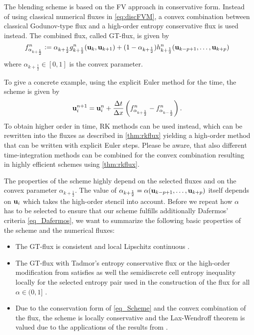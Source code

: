 \begin{definition}\label{def_Blending}
The blending scheme is based on the FV approach in conservative form. Instead of using classical numerical fluxes in 
\eqref{eq:discFVM}, a convex combination between classical Godunov-type flux  and  a high-order entropy conservative flux  is used instead. 
The combined flux, called GT-flux, is given by
	\begin{equation}\label{eq_GT_flux}
     f_{\alpha_{k+\frac 1 2}}^n := \alpha_{k + \frac 1 2} g^n_{k+\frac 1 2} ( {\mathbf{u}_k,\mathbf{u}_{k+1}}) + (1-\alpha_{k+\frac 1 2}) h^n_{k+\frac 1 2} (\mathbf{u}_{k-p+1}, \dots, \mathbf{u}_{k+p})
     	\end{equation}
	where $\alpha_{k+\frac 1 2} \in [0,1]$ is the convex parameter. 
\end{definition}
\begin{example}
To give a concrete example, using the explicit Euler method for the time,  the scheme is given by 
\begin{equation}\label{eq_Scheme}
\mathbf{u}^{n+1}_i =\mathbf{u}^{n}_i + \frac{\Delta t}{\Delta x} \left(  f_{\alpha_{k+\frac 1 2}}^n   - f_{\alpha_{k-\frac 1 2}}^n  \right).
\end{equation}
To obtain higher order in time, RK methods can be used instead, which can be rewritten into the fluxes as described in  \cref{thm:rkflux} yielding a high-order method that can be written with explicit Euler steps. Please be aware, that also different time-integration methods can be combined for the convex combination resulting in highly efficient schemes using  \cref{thm:rkflux}.
\end{example}
The properties of the scheme highly depend on the selected fluxes and  on the convex parameter $\alpha_{k+\frac12}$.
The value of $\alpha_{k+\frac12} = \alpha (\mathbf{u}_{k-p+1}, \dots, \mathbf{u}_{k+p})$ itself depends on $\mathbf{u}_i$ %
which takes the high-order stencil into account.
Before we repeat how $\alpha$ has to be selected to ensure that our scheme fulfills additionally Dafermos' criteria \eqref{eq_Dafermos}, we want to summarize the following  basic properties of the scheme and the numerical fluxes:
\begin{itemize}
\item The GT-flux is consistent and local Lipschitz continuous \cite[Lemma 1]{klein2021using}. 
\item The GT-flux with Tadmor's entropy conservative flux or the high-order modification from \cite{lefloch2002fully} satisfies as well the semidiscrete cell entropy inequality locally for the selected entropy pair used in the construction of the flux for all $\alpha  \in (0, 1]$ \cite[Theorem 1]{klein2021using}.
\item Due to the conservation form of \eqref{eq_Scheme} and the convex combination of the flux, the scheme is locally conservative and the Lax-Wendroff theorem is valued due to the applications of the results from \cite{shi2018local}.
\end{itemize}
